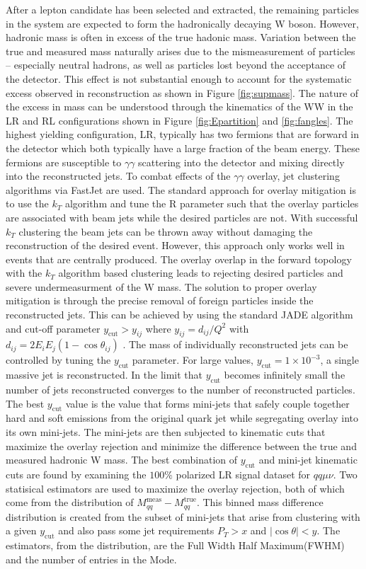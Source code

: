 After a lepton candidate has been selected and extracted, the remaining particles in the system are expected to form the hadronically decaying W boson. However, hadronic mass is often in excess of the true hadonic mass. Variation between the true and measured mass naturally arises due to the mismeasurement of particles -- especially neutral hadrons, as well as particles lost beyond the acceptance of the detector. This effect is not substantial enough to account for the systematic excess observed in reconstruction as shown in Figure \ref{fig:supmass}. The nature of the excess in mass can be understood through the kinematics of the WW in the LR and RL configurations shown in Figure \ref{fig:Epartition} and \ref{fig:fangles}. The highest yielding configuration, LR, typically has two fermions that are forward in the detector which both typically have a large fraction of the beam energy. These fermions are susceptible to $\gamma\gamma$ scattering into the detector and mixing directly into the reconstructed jets. To combat effects of the $\gamma \gamma$ overlay, jet clustering algorithms via FastJet\cite{fastjet} are used.  The standard approach for overlay mitigation is to use the $k_T$ algorithm\cite{kt} and tune the R parameter such that the overlay particles are associated with beam jets while the desired particles are not. With successful $k_T$ clustering the beam jets can be thrown away without damaging the reconstruction of the desired event. However, this approach only works well in events that are centrally produced.  The overlay overlap in the forward topology with the $k_T$ algorithm  based clustering leads to rejecting desired particles and severe undermeasurment of the W mass. The solution to proper overlay mitigation is through the precise removal of foreign particles inside the reconstructed jets.  This can be achieved by using the standard JADE algorithm and cut-off parameter $y_{\text{cut}} > y_{ij}$ where $y_{ij} = d_{ij} / Q^2$ with $d_{ij} = 2E_i E_j(1-\cos\theta_{ij})$ \cite{fastjet}.  The mass of individually reconstructed jets can be controlled by tuning the $y_{\text{cut}}$ parameter. For large values, $y_{\text{cut}} =1\times10^{-3}$, a single massive jet is reconstructed. In the limit that $y_{\text{cut}}$ becomes infinitely small the number of jets reconstructed converges to the number of reconstructed particles.  The best $y_{\text{cut}}$ value is the value that forms mini-jets that safely couple together hard and soft emissions from  the original quark jet while segregating overlay into its own mini-jets. The mini-jets are then subjected to kinematic cuts that maximize the overlay rejection and minimize the difference  between the true and measured hadronic W mass. 	The best combination of $y_{\text{cut}}$ and mini-jet kinematic cuts are found by examining the $100\%$ polarized LR signal dataset for $qq \mu \nu$.  Two statisical estimators are used to maximize the overlay rejection, both of which come from the distribution of $M_{qq}^{\text{meas}} - M_{qq}^{\text{true}}$. This binned mass difference distribution is created from the subset of mini-jets that arise from clustering with a given $y_{\text{cut}}$ and also pass some jet requirements $P_{T} > x$ and $|\cos\theta| < y$. The estimators, from the distribution, are the Full Width Half Maximum(FWHM) and the number of entries in the Mode.  
